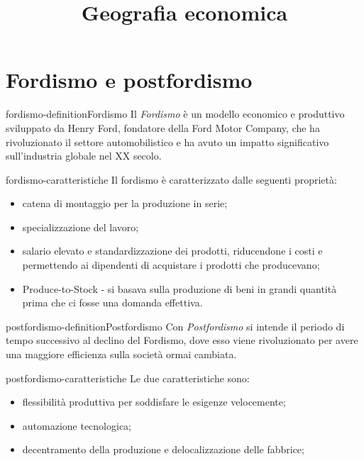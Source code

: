 \documentclass[preview]{standalone}
\begin{document}
\title{Geografia economica}
\genpage

\section{Fordismo e postfordismo}

\begin{snippetdefinition}{fordismo-definition}{Fordismo}
    Il \textit{Fordismo} è un modello economico e produttivo sviluppato da Henry Ford,
    fondatore della Ford Motor Company, che ha rivoluzionato il settore automobilistico
    e ha avuto un impatto significativo sull'industria globale nel XX secolo.
\end{snippetdefinition}

\begin{snippet}{fordismo-caratteristiche}
    Il fordismo è caratterizzato dalle seguenti proprietà:
    \begin{itemize}
        \item catena di montaggio per la produzione in serie;
        \item specializzazione del lavoro;
        \item salario elevato e standardizzazione dei prodotti, riducendone i costi e permettendo ai dipendenti di acquistare i prodotti che producevano;
        \item Produce-to-Stock - si basava sulla produzione di beni in grandi quantità prima che ci fosse una domanda effettiva.
    \end{itemize}
\end{snippet}

\begin{snippetdefinition}{postfordismo-definition}{Postfordismo}
    Con \textit{Postfordismo} si intende il periodo di tempo
    successivo al declino del Fordismo, dove esso viene rivoluzionato per avere una maggiore efficienza
    sulla società ormai cambiata.
\end{snippetdefinition}

\begin{snippet}{postfordismo-caratteristiche}
    Le due caratteristiche sono:
    \begin{itemize}
        \item flessibilità produttiva per soddisfare le esigenze velocemente;
        \item automazione tecnologica;
        \item decentramento della produzione e delocalizzazione delle fabbrice;
    \end{itemize}
\end{snippet}
\end{document}
